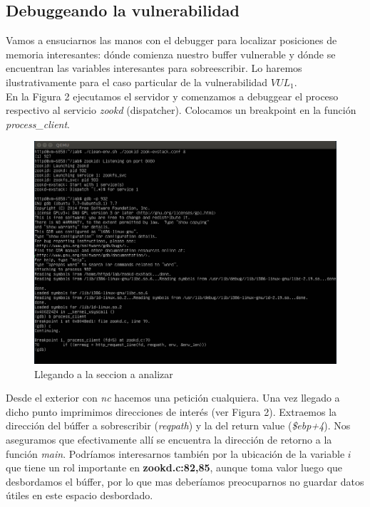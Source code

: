 \documentclass[12pt]{article}
\begin{document}
\subsection{Debuggeando la vulnerabilidad}
Vamos a ensuciarnos las manos con el debugger para localizar posiciones de memoria interesantes: dónde comienza nuestro buffer vulnerable y dónde se encuentran las variables interesantes para sobreescribir. Lo haremos ilustrativamente para el caso particular de la vulnerabilidad $VUL_1$. \\

En la Figura 2 ejecutamos el servidor y comenzamos a debuggear el proceso respectivo al servicio \textit{zookd} (dispatcher). Colocamos un breakpoint en la función \textit{process\_client}.

\begin{figure}[htp]
\centering
\includegraphics[scale=0.42]{./imagenes/gdb1.png}
\caption{Llegando a la seccion a analizar}
\end{figure}

Desde el exterior con \textit{nc} hacemos una petición cualquiera. Una vez llegado a dicho punto imprimimos direcciones de interés (ver Figura 2). Extraemos la dirección del búffer a sobrescribir (\textit{reqpath}) y la del return value (\textit{\$ebp+4}). Nos aseguramos que efectivamente allí se encuentra la dirección de retorno a la función \textit{main}. Podríamos interesarnos también por la ubicación de la variable $i$ que tiene un rol importante en \textbf{ \lbrack zookd.c:82,85\rbrack }, aunque toma valor luego que desbordamos el búffer, por lo que mas deberíamos preocuparnos no guardar datos útiles en este espacio desbordado.
\end{document}
